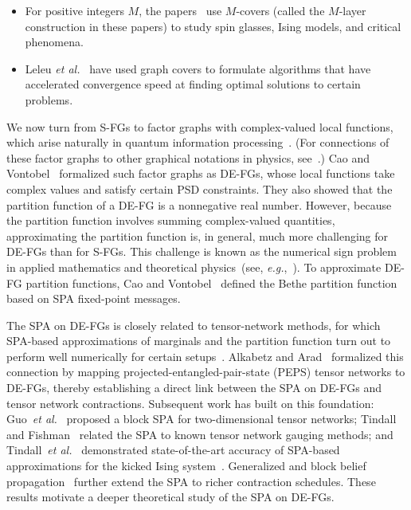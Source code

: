 \documentclass[journal]{IEEEtran}
\newcommand{\add}[1]{{\color{black}#1}}
\newcommand*{\eg}{\textit{e.g.}}
\newcommand*{\etal}{\textit{et al.}}
\begin{document}
\begin{itemize}
  \item \add{For positive integers $M$, the
          papers~\cite{Altieri2017,Angelini2022,AngeliniPalazzi2024,Palazzi2025} use
          $M$-covers (called the $M$-layer construction in these papers) to study
          spin glasses, Ising models, and critical phenomena.}

  \item \add{Leleu \etal~\cite{Leleu2026} have used graph covers to formulate
          algorithms that have accelerated convergence speed at finding optimal
          solutions to certain problems.}

\end{itemize}

\add{We now turn from S-FGs to factor graphs with complex-valued local
  functions, which arise naturally in quantum information
  processing~\cite{Loeliger2012,Loeliger2017,Loeliger2020,Mori2015a}.} (For
connections of these factor graphs to other graphical notations in physics,
see~\cite[Appendix~A]{Loeliger2017}.) \add{Cao and Vontobel~\cite{Cao2017}
  formalized such factor graphs as DE-FGs, whose local functions take complex
  values and satisfy certain PSD constraints. They also showed that} the
partition function of a DE-FG is a \add{nonnegative} real number. However,
because the partition function involves summing complex-valued quantities,
approximating the partition function is, in general, much more challenging for
DE-FGs than for S-FGs. This challenge is known as the numerical sign problem
in applied mathematics and theoretical physics~(see,
\eg,~\cite{LohJr1990}). \add{To approximate DE-FG partition functions, Cao and
  Vontobel~\cite{Cao2017} defined the Bethe partition function based on SPA
  fixed-point messages.}

\add{The SPA on DE-FGs is closely related to tensor-network methods, for which
  SPA-based approximations of marginals and the partition function turn out to
  perform well numerically for certain
  setups~\cite{Cirac2009,Coecke2010,Robeva2019,Alkabetz2021}.} Alkabetz and
Arad~\cite{Alkabetz2021} formalized this connection by mapping
projected-entangled-pair-state (PEPS) tensor networks to DE-FGs, thereby
establishing a direct link between the SPA on DE-FG\add{s} and tensor network
contractions.  \add{Subsequent work has built on this foundation:
  Guo~\etal~\cite{Guo2023} proposed a block SPA for two-dimensional tensor
  networks;} Tindall and Fishman~\cite{Tindall2023} related the SPA to known
tensor network gauging methods; and Tindall~\etal~\cite{Tindall2024}
\add{demonstrated state-of-the-art accuracy of SPA-based approximations for
  the kicked Ising system~\cite{Kim2023}}. \add{Generalized and block belief
  propagation~\cite{Tindall2026,Gutman2026} further extend the SPA to richer
  contraction schedules. These results motivate a deeper theoretical study of
  the SPA on DE-FGs.}
\end{document}
